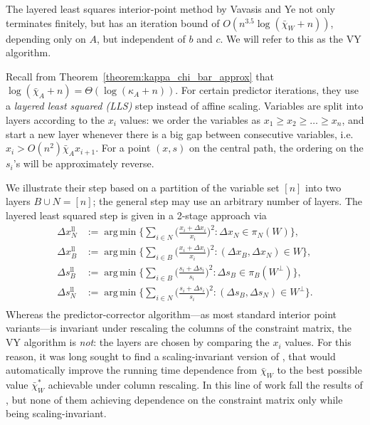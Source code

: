\documentclass[11pt, a4paper]{article}
\newcommand{\1}{\mathbbm{1}}
\newcommand{\lal}{\mathrm{ll}}
\theoremstyle{case}
\DeclareMathOperator*{\argmin}{arg\,min}
\begin{document}
The layered least squares interior-point method by Vavasis and Ye \cite{Vavasis1996} not only  terminates finitely, but has an iteration bound
of $O(n^{3.5}\log(\bar \chi_W + n))$, depending only on $A$, but independent of $b$ and $c$. We will refer to this as the VY algorithm.

Recall from Theorem~\ref{theorem:kappa_chi_bar_approx} that $\log(\bar \chi_A + n)=\Theta(\log(\kappa_A + n))$.
 For certain predictor iterations, they use a
 \emph{layered least squared (LLS)} step instead of affine scaling.
Variables are split into layers according to the $x_i$ values: we order the variables as $x_1\ge x_2\ge\ldots\ge x_n$, and start a new layer whenever there is a big gap between consecutive variables, i.e. $x_i>O(n^2)\bar\chi_A x_{i+1}$. For a point $(x,s)$ on the central path, the ordering on the $s_i$'s will be approximately reverse.

We illustrate their step based on a partition of the variable set $[n]$ into two layers $B \cup N = [n]$; the general step may use an arbitrary number of layers.
The layered least squared step is given in a 2-stage approach via
\begin{equation}
  \label{sys:lls}
  \begin{aligned}
\Delta x_N^\lal &:= \argmin \Big\{\sum_{i \in N} \Big(\frac{x_i + \Delta x_i}{x_i}\Big)^2 : \Delta x_N \in \pi_N(W)\Big\}, \\
\Delta x_B^\lal &:= \argmin \Big\{\sum_{i \in B} \Big(\frac{x_i + \Delta x_i}{x_i}\Big)^2 : (\Delta x_B, \Delta x_N)\in W\Big\}, \\[10pt]
\Delta s_B^\lal &:= \argmin \Big\{\sum_{i \in B} \Big(\frac{s_i + \Delta s_i}{s_i}\Big)^2 : \Delta s_B \in \pi_B(W^\perp)\Big\}, \\
\Delta s_N^\lal &:= \argmin \Big\{\sum_{i \in N} \Big(\frac{s_i + \Delta s_i}{s_i}\Big)^2 : (\Delta s_B, \Delta s_N)\in W^\perp\Big\}. \\
  \end{aligned}
\end{equation}
Whereas the  predictor-corrector algorithm---as most standard interior point variants---is invariant under rescaling the columns of the constraint matrix, the VY algorithm is \emph{not}: the layers are chosen by comparing the $x_i$ values. For this reason, it was long sought to find a scaling-invariant version of \cite{Vavasis1996}, that would automatically improve the running time dependence from $\bar\chi_W$ to the best possible value $\bar\chi^*_W$ achievable under column rescaling. In this line of work fall the results of \cite{Monteiro2008,Monteiro2003,MonteiroT05}, but none of them achieving dependence on the constraint matrix only while being scaling-invariant. 
\end{document}
